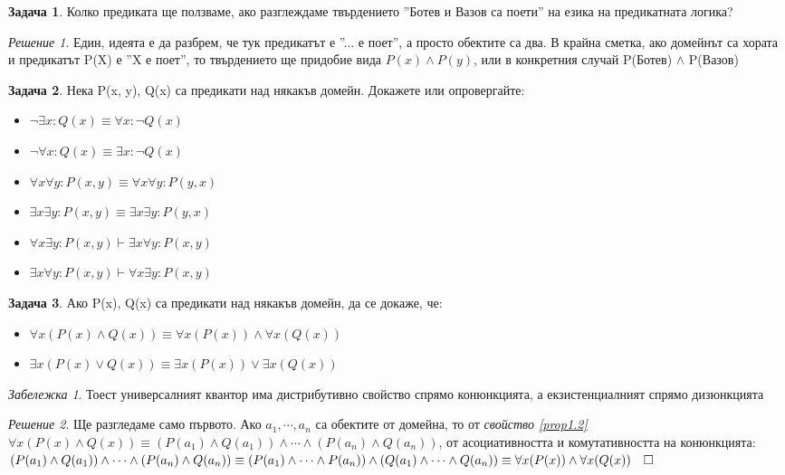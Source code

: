 \documentclass[10pt, a4paper]{article}
\theoremstyle{definition}
\newtheorem{problem}{Задача}
\theoremstyle{remark}
\newtheorem*{remark}{Забележка}
\newtheorem*{sol}{Решение}
\begin{document}
\begin{problem}
 Колко предиката ще ползваме, ако разглеждаме твърдението ''Ботев и Вазов са поети'' на езика на предикатната логика?
\end{problem}
\begin{sol}
 Един, идеята е да разбрем, че тук предикатът е ''... е поет'', а просто обектите са два. В крайна сметка, ако домейнът са хората и предикатът P(X) е ''X е поет'', то твърдението ще придобие вида \(P(x) \wedge P(y)\), или в конкретния случай P(Ботев) \(\wedge\) P(Вазов)
\end{sol}

\begin{problem}
    Нека P(x, y), Q(x) са предикати над някакъв домейн. Докажете или опровергайте:
    \begin{itemize}
        \item \(\neg \exists x: Q(x) \equiv \forall x: \neg Q(x)\)
        \item \(\neg \forall x: Q(x) \equiv \exists x: \neg Q(x)\)
        \item \(\forall x\forall y: P(x, y) \equiv \forall x\forall y: P(y, x)\)
        \item \(\exists x\exists y: P(x, y) \equiv \exists x\exists y: P(y, x)\)
        \item \(\forall x\exists y: P(x, y) \vdash \exists x\forall y: P(x, y)\)
        \item \(\exists x\forall y: P(x, y) \vdash \forall x\exists y: P(x, y)\)
    \end{itemize}
\end{problem}

\begin{problem}
Ако P(x), Q(x) са предикати над някакъв домейн, да се докаже, че:
    \begin{itemize}
        \item \(\forall x(P(x)\wedge Q(x)) \equiv \forall x(P(x)) \wedge \forall x(Q(x))\)
        \item \(\exists x(P(x)\vee Q(x)) \equiv \exists x(P(x)) \vee \exists x(Q(x))\)
    \end{itemize}
\end{problem}
\begin{remark}
    Тоест универсалният квантор има дистрибутивно свойство спрямо конюнкцията, а екзистенциалният спрямо дизюнкцията
\end{remark}
\begin{sol}
    Ще разгледаме само първото. Ако \(a_1, \cdots, a_n\) са обектите от домейна, то от \emph{свойство \ref{prop1.2}} \(\forall x(P(x)\wedge Q(x)) \equiv (P(a_1)\wedge Q(a_1)) \wedge \cdots \wedge (P(a_n)\wedge Q(a_n))\), от асоциативността и комутативността на конюнкцията:\\ \((P(a_1)\wedge Q(a_1)) \wedge \cdots \wedge (P(a_n)\wedge Q(a_n)) \equiv\\ (P(a_1) \wedge\cdots\wedge P(a_n)) \wedge (Q(a_1) \wedge\cdots\wedge Q(a_n)) \equiv\\ \forall x(P(x)) \wedge \forall x(Q(x)) \quad\square\) 
\end{sol}
\end{document}

